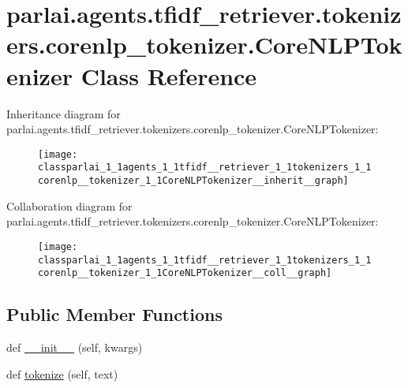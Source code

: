 \hypertarget{classparlai_1_1agents_1_1tfidf__retriever_1_1tokenizers_1_1corenlp__tokenizer_1_1CoreNLPTokenizer}{}\section{parlai.\+agents.\+tfidf\+\_\+retriever.\+tokenizers.\+corenlp\+\_\+tokenizer.\+Core\+N\+L\+P\+Tokenizer Class Reference}
\label{classparlai_1_1agents_1_1tfidf__retriever_1_1tokenizers_1_1corenlp__tokenizer_1_1CoreNLPTokenizer}


Inheritance diagram for parlai.\+agents.\+tfidf\+\_\+retriever.\+tokenizers.\+corenlp\+\_\+tokenizer.\+Core\+N\+L\+P\+Tokenizer\+:
\nopagebreak
\begin{figure}[H]
\begin{center}
\leavevmode
\texttt{[image: classparlai\_1\_1agents\_1\_1tfidf\_\_retriever\_1\_1tokenizers\_1\_1corenlp\_\_tokenizer\_1\_1CoreNLPTokenizer\_\_inherit\_\_graph]}
\end{center}
\end{figure}


Collaboration diagram for parlai.\+agents.\+tfidf\+\_\+retriever.\+tokenizers.\+corenlp\+\_\+tokenizer.\+Core\+N\+L\+P\+Tokenizer\+:
\nopagebreak
\begin{figure}[H]
\begin{center}
\leavevmode
\texttt{[image: classparlai\_1\_1agents\_1\_1tfidf\_\_retriever\_1\_1tokenizers\_1\_1corenlp\_\_tokenizer\_1\_1CoreNLPTokenizer\_\_coll\_\_graph]}
\end{center}
\end{figure}
\subsection*{Public Member Functions}
\begin{DoxyCompactItemize}
\item 
def \hyperlink{classparlai_1_1agents_1_1tfidf__retriever_1_1tokenizers_1_1corenlp__tokenizer_1_1CoreNLPTokenizer_a69a5d8b41630a6bb53b3680a68136e8f}{\+\_\+\+\_\+init\+\_\+\+\_\+} (self, kwargs)
\item 
def \hyperlink{classparlai_1_1agents_1_1tfidf__retriever_1_1tokenizers_1_1corenlp__tokenizer_1_1CoreNLPTokenizer_af7fb8c70ddbd8c11e3e32365af30e567}{tokenize} (self, text)
\end{DoxyCompactItemize}
